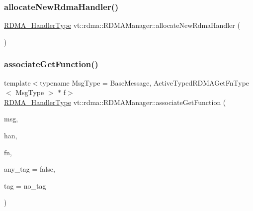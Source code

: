 \subsubsection{\texorpdfstring{allocate\+New\+Rdma\+Handler()}{allocateNewRdmaHandler()}}
{\footnotesize\ttfamily \hyperlink{namespacevt_a9530efb893c0f3846e8ac5f0507e0f49}{R\+D\+M\+A\+\_\+\+Handler\+Type} vt\+::rdma\+::\+R\+D\+M\+A\+Manager\+::allocate\+New\+Rdma\+Handler (\begin{DoxyParamCaption}{ }\end{DoxyParamCaption})}

\mbox{\label{structvt_1_1rdma_1_1_r_d_m_a_manager_abcddc1a18794163032758fcf035ff406}} 
\subsubsection{\texorpdfstring{associate\+Get\+Function()}{associateGetFunction()}}
{\footnotesize\ttfamily template$<$typename Msg\+Type  = Base\+Message, Active\+Typed\+R\+D\+M\+A\+Get\+Fn\+Type$<$ Msg\+Type $>$ $\ast$ f$>$ \\
\hyperlink{namespacevt_a9530efb893c0f3846e8ac5f0507e0f49}{R\+D\+M\+A\+\_\+\+Handler\+Type} vt\+::rdma\+::\+R\+D\+M\+A\+Manager\+::associate\+Get\+Function (\begin{DoxyParamCaption}\item[{Msg\+Type $\ast$}]{msg,  }\item[{\hyperlink{namespacevt_a10442579ec4e7ebef223818e64bcf908}{R\+D\+M\+A\+\_\+\+Handle\+Type} const \&}]{han,  }\item[{\hyperlink{structvt_1_1rdma_1_1_r_d_m_a_manager_a0d865535d118fe9dcab074fd3df74ce1}{R\+D\+M\+A\+\_\+\+Get\+Typed\+Function\+Type}$<$ Msg\+Type $>$ const \&}]{fn,  }\item[{bool const \&}]{any\+\_\+tag = {\ttfamily false},  }\item[{\hyperlink{namespacevt_a84ab281dae04a52a4b243d6bf62d0e52}{Tag\+Type} const \&}]{tag = {\ttfamily no\+\_\+tag} }\end{DoxyParamCaption})\hspace{0.3cm}{\ttfamily [inline]}}

\mbox{\label{structvt_1_1rdma_1_1_r_d_m_a_manager_a5092afb73c1a6fb69cb211f23eb704cb}} 
